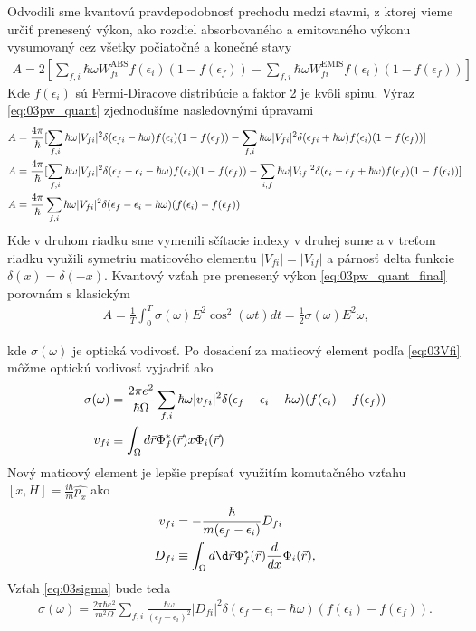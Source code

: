 Odvodili sme kvantovú pravdepodobnosť prechodu medzi stavmi, z ktorej vieme určiť prenesený výkon, ako rozdiel absorbovaného a emitovaného výkonu vysumovaný cez všetky počiatočné a konečné stavy
\begin{align}
\label{eq:03pw_quant}
A=2[\sum_{f,i}\hbar\omega W_{fi}^{\mathrm{ABS}}f(\epsilon_i)(1-f(\epsilon_f))-\sum_{f,i}\hbar\omega W_{fi}^{\mathrm{EMIS}}f(\epsilon_i)(1-f(\epsilon_f))] \
\end{align}
Kde $f(\epsilon_i)$ sú Fermi-Diracove distribúcie a faktor 2 je kvôli spinu. Výraz \eqref{eq:03pw_quant} zjednodušíme nasledovnými úpravami
\begin{align}
\label{eq:03pw_quant_final}
\notag
A&=\frac{4\pi}{\hbar}[\sum_{f,i}\hbar\omega|V_{fi}|^2\delta(\epsilon_{fi}-\hbar\omega)f(\epsilon_i)(1-f(\epsilon_f))-\sum_{f,i}\hbar\omega|V_{fi}|^2\delta(\epsilon_{fi}+\hbar\omega) f(\epsilon_i)(1-f(\epsilon_f))]\\ \notag
A&=\frac{4\pi}{\hbar}[\sum_{f,i}\hbar\omega|V_{fi}|^2\delta(\epsilon_f-\epsilon_i-\hbar\omega)f(\epsilon_i)(1-f(\epsilon_f))-\sum_{i,f}\hbar\omega|V_{if}|^2\delta(\epsilon_i-\epsilon_f+\hbar\omega) f(\epsilon_f)(1-f(\epsilon_i))]\\ 
A&=\frac{4\pi}{\hbar}\sum_{f,i}\hbar\omega|V_{fi}|^2\delta(\epsilon_f-\epsilon_i-\hbar\omega)(f(\epsilon_i)-f(\epsilon_f)) 
\end{align}
Kde v druhom riadku sme vymenili sčítacie indexy v druhej sume a v treťom riadku využili symetriu maticového elementu $|V_{fi}|=|V_{if}|$ a  párnosť delta funkcie $\delta(x)=\delta(-x)$. Kvantový vzťah pre prenesený výkon \eqref{eq:03pw_quant_final} porovnám s klasickým 
\begin{align}
A=\frac{1}{T}\int_0^T\sigma(\omega)E^2\cos^2(\omega t)dt=\frac{1}{2}\sigma(\omega)E^2\omega \text{,}
\end{align}

kde $\sigma(\omega)$ je optická vodivosť. Po dosadení za maticový element podľa \eqref{eq:03Vfi} môžme optickú vodivosť vyjadriť ako
\begin{align}
\label{eq:03sigma}
\sigma(\omega)&=\frac{2\pi e^2}{\hbar \Omega}\sum_{f,i}\hbar\omega|v_{fi}|^2\delta(\epsilon_f-\epsilon_i-h\omega)(f(\epsilon_i)-f(\epsilon_f))\\
v_{fi}&\equiv \int_{\Omega}d\vec{r} \Phi_f^*(\vec{r})x\Phi_i(\vec{r})
\end{align}
Nový maticový element je lepšie prepísať využitím komutačného vzťahu $[x,H]=\frac{i\hbar}{m}\hat{p_x}$ ako
\begin{align}
v_{fi}&=-\frac{\hbar}{m(\epsilon_f-\epsilon_i)}D_{fi}\\
\label{eq:03matrix_element}
D_{fi}&\equiv \int_{\Omega}d\d\vr\Phi_f^*(\vr)\frac{d}{dx}\Phi_i(\vr)\text{,}
\end{align}
Vzťah \eqref{eq:03sigma} bude teda
\begin{align}
\label{eq:03sigma2}
\sigma(\omega)=\frac{2\pi\hbar e^2}{m^2\Omega} \sum_{f,i}\frac{\hbar\omega}{(\epsilon_f-\epsilon_i)^2}|D_{fi}|^2\delta(\epsilon_f-\epsilon_i-\hbar\omega)(f(\epsilon_i)-f(\epsilon_f))\text{.}
\end{align}

